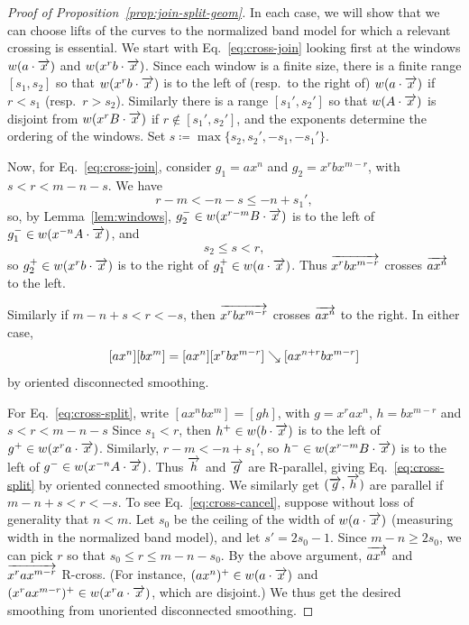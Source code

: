 \begin{proof}[Proof of Proposition~\ref{prop:join-split-geom}]
  In each case, we will show that we can choose lifts of the curves to
  the normalized band model for which a
  relevant crossing is essential. We start with
  Eq.~\eqref{eq:cross-join} looking first at the windows $w(a\cdot
  \overrightarrow{x})$ and $w(x^rb\cdot\overrightarrow{x})$.
  Since each window is a
  finite size, there is a finite range $[s_1,s_2]$ so that $w(x^rb\cdot\overrightarrow{x})$
  is to the left of (resp.~to the right of) $w(a\cdot\overrightarrow{x})$ if $r < s_1$
  (resp.\ $r > s_2$).
  Similarly there
  is a range $[s_1',s_2']$ so that $w(A\cdot\overrightarrow{x})$ is disjoint from
  $w(x^rB\cdot\overrightarrow{x})$ if $r \notin [s_1',s_2']$, and the exponents determine the
  ordering of the windows. Set
  $s \coloneqq \max\{s_2,s_2',-s_1,-s_1'\}$.

  Now, for Eq.~\eqref{eq:cross-join}, consider
  $g_1 = ax^n$ and $g_2 = x^rbx^{m-r}$, with $s < r < m-n-s$. We have
  \[
    r-m < -n-s \le -n+s_1',
  \]
  so, by Lemma~\ref{lem:windows}, $g_2^- \in w(x^{r-m}B\cdot\overrightarrow{x})$
  is to the left of $g_1^- \in w(x^{-n}A\cdot\overrightarrow{x})$, and
  \[
    s_2 \le s < r,
  \]
  so $g_2^+ \in w(x^rb\cdot\overrightarrow{x})$ is to the right of $g_1^+ \in
  w(a\cdot\overrightarrow{x})$. Thus
  $\overrightarrow{x^rbx^{m-r}}$ crosses $\overrightarrow{ax^n}$ to the left. 
  
  
  Similarly if
  $m-n+s < r < -s$, then $\overrightarrow{x^rbx^{m-r}}$ crosses $\overrightarrow{ax^n}$ to the
  right. In either case,
    \[
[ax^n][bx^m] = [ax^n][x^r bx^{m-r}] \mathrel{\searrow} [ax^{n+r}bx^{m-r}]
  \]
  by oriented disconnected smoothing.

  For Eq.~\eqref{eq:cross-split},  write   $[ax^n bx^m]=[gh]$, with
  $g=x^rax^n$, $h=bx^{m-r}$ and $s < r < m-n-s$
  Since $s_1 < r$, then $h^+ \in w(b\cdot\overrightarrow{x})$ is to the left of
  $g^+ \in w(x^r a\cdot\overrightarrow{x})$.
  Similarly, $r-m < -n+s_1'$, so $h^-\in w(x^{r-m}B \cdot\overrightarrow{x})$ is to the left
  of $g^- \in w(x^{-n}A\cdot\overrightarrow{x})$. 
  Thus $\overrightarrow{h}$ and $\overrightarrow{g}$
  are R-parallel, giving Eq.~\eqref{eq:cross-split} by oriented
  connected smoothing.
  We similarly get $(\overrightarrow{g},\overrightarrow{h})$  are parallel if $m-n+s < r < -s$.
  To see Eq.~\eqref{eq:cross-cancel}, suppose without loss of generality
  that $n < m$. Let $s_0$ be the ceiling of the width of $w(a\cdot\overrightarrow{x})$
  (measuring width in the normalized band model),
  and
  let $s' = 2s_0 - 1$. Since $m-n \ge 2s_0$, we can pick $r$ so that
  $s_0 \le r \le m-n-s_0$. By the above argument, $\overrightarrow{ax^n}$ and
  $\overrightarrow{x^rax^{m-r}}$ R-cross. (For instance, $(ax^n)^+ \in w(a\cdot\overrightarrow{x})$ and
  $(x^rax^{m-r})^+ \in w(x^r a\cdot\overrightarrow{x})$, which are disjoint.) We thus get the
  desired smoothing from unoriented
  disconnected smoothing.


\end{proof}
